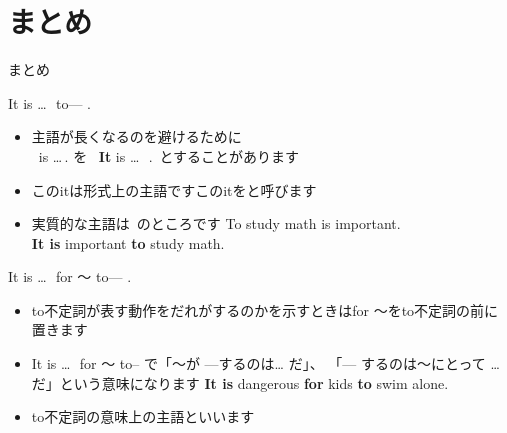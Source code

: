 \documentclass[aspectratio=169,xcolor={dvipsnames,table}]{beamer}
\begin{document}
\section{まとめ}
\begin{frame}[plain]{まとめ}
 \begin{block}{It is \ldots\,\, to--- .}\small
\begin{itemize}[square]
 \item 主語が長くなるのを避けるために\\
\mbox{}\,\,\,is\,\,\ldots\,. を\,\,\,
{\bfseries It} is \ldots\,\,\,{\setlength{\fboxrule}{1pt}}\,.\,
とすることがあります
 \item このitは形式上の主語です\hfill{\scriptsize このitをと呼びます}
 \item 実質的な主語は\,{\setlength{\fboxrule}{1pt}} のところです%
\hfill{\scriptsize To study math is important.}\\
\hfill{\scriptsize \textbf{It is} important \textbf{to} study math.}
\end{itemize}

\end{block}

\begin{block}{It is \ldots\,\, for ～ to--- .}\small
\begin{itemize}[square]
 \item to不定詞が表す動作をだれがするのかを示すときはfor ～をto不定詞の前に置きます
 \item It is\,\,\ldots\,\, for ～ to--\,\,で「～が ---するのは\ldots\,\,だ」、
「--- するのは～にとって\,\,\ldots\,\,だ」という意味になります%
\hfill{\scriptsize \textbf{It is} dangerous \textbf{for} kids \textbf{to} swim alone.}
 \item to不定詞の意味上の主語といいます
\end{itemize}
\end{block}
\vspace{-10pt}
\hfill{\scriptsize {}}
\end{frame}
\end{document}
